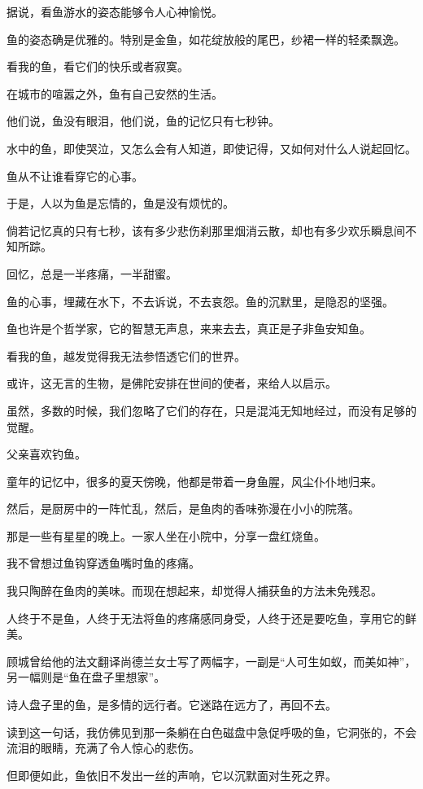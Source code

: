 \documentclass[12pt,a4paper]{article}
\def\blankrev{\vspace{1ex}}									%
\begin{document}
		\blankrev
		据说，看鱼游水的姿态能够令人心神愉悦。\par
		鱼的姿态确是优雅的。特别是金鱼，如花绽放般的尾巴，纱裙一样的轻柔飘逸。\par
		看我的鱼，看它们的快乐或者寂寞。\par
		在城市的喧嚣之外，鱼有自己安然的生活。

		\blankrev
		他们说，鱼没有眼泪，他们说，鱼的记忆只有七秒钟。\par
		水中的鱼，即使哭泣，又怎么会有人知道，即使记得，又如何对什么人说起回忆。

		\blankrev
		鱼从不让谁看穿它的心事。\par
		于是，人以为鱼是忘情的，鱼是没有烦忧的。\par
		倘若记忆真的只有七秒，该有多少悲伤刹那里烟消云散，却也有多少欢乐瞬息间不知所踪。

		\blankrev
		回忆，总是一半疼痛，一半甜蜜。

		\blankrev
		鱼的心事，埋藏在水下，不去诉说，不去哀怨。鱼的沉默里，是隐忍的坚强。\par
		鱼也许是个哲学家，它的智慧无声息，来来去去，真正是子非鱼安知鱼。\par
		看我的鱼，越发觉得我无法参悟透它们的世界。\par
		或许，这无言的生物，是佛陀安排在世间的使者，来给人以启示。\par
		虽然，多数的时候，我们忽略了它们的存在，只是混沌无知地经过，而没有足够的觉醒。

		\blankrev
		父亲喜欢钓鱼。\par
		童年的记忆中，很多的夏天傍晚，他都是带着一身鱼腥，风尘仆仆地归来。\par
		然后，是厨房中的一阵忙乱，然后，是鱼肉的香味弥漫在小小的院落。\par
		那是一些有星星的晚上。一家人坐在小院中，分享一盘红烧鱼。

		\blankrev
		我不曾想过鱼钩穿透鱼嘴时鱼的疼痛。\par
		我只陶醉在鱼肉的美味。而现在想起来，却觉得人捕获鱼的方法未免残忍。\par
		人终于不是鱼，人终于无法将鱼的疼痛感同身受，人终于还是要吃鱼，享用它的鲜美。

		\blankrev
		顾城曾给他的法文翻译尚德兰女士写了两幅字，一副是“人可生如蚁，而美如神”，另一幅则是“鱼在盘子里想家”。\par
		诗人盘子里的鱼，是多情的远行者。它迷路在远方了，再回不去。\par
		读到这一句话，我仿佛见到那一条躺在白色磁盘中急促呼吸的鱼，它洞张的，不会流泪的眼睛，充满了令人惊心的悲伤。\par
		但即便如此，鱼依旧不发出一丝的声响，它以沉默面对生死之界。
\end{document}
